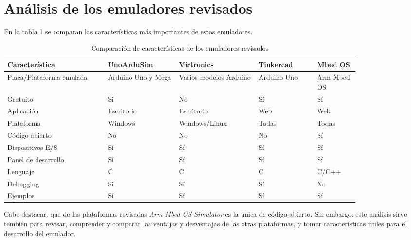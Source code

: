 \section{Análisis de los emuladores revisados}
\label{sec:Análisis de los emuladores revisados}

En la tabla \ref{tab:simuladores} se comparan las características más importantes de estos emuladores. 

\hfill \break
\hfill \break
\hfill \break
\hfill \break
\hfill \break
\hfill \break
\hfill \break
\hfill \break
\hfill \break

\begin{table}[ht]
\centering
\caption[Comparación de características de los emuladores revisados]{Comparación de características de los emuladores revisados}
\begin{tabular}{p{0.24\linewidth} p{0.17\linewidth}  p{0.19\linewidth}  p{0.14\linewidth}  p{0.10\linewidth}}
\toprule
\textbf{Característica} 
& \textbf{UnoArduSim}
& \textbf{Virtronics}
& \textbf{Tinkercad}
& \textbf{Mbed OS}
\\
\midrule
Placa/Plataforma emulada & Arduino Uno y Mega & Varios modelos Arduino & Arduino Uno & Arm Mbed OS\\
Gratuito &    Sí & No & Sí & Sí\\
Aplicación & Escritorio & Escritorio & Web & Web\\
Plataforma & Windows & Windows/Linux & Todas & Todas\\
Código abierto & No & No & No & Sí\\
Dispositivos E/S & Sí & Sí & Sí & Sí  \\
Panel de desarrollo & Sí & Sí & Sí & Sí \\
Lenguaje & C & C & C & C/C++\\
Debugging & Sí & Sí & Sí & No\\
Ejemplos & Sí & Sí & Sí & Sí\\
\bottomrule
\hline
\end{tabular}
\label{tab:simuladores}
\end{table}

Cabe destacar, que de las plataformas revisadas \textit{Arm Mbed OS Simulator} es la única de código abierto. Sin embargo, este análisis sirve tembién para revisar, comprender y comparar las ventajas y desventajas de las otras plataformas, y tomar características útiles para el desarrollo del emulador. 


